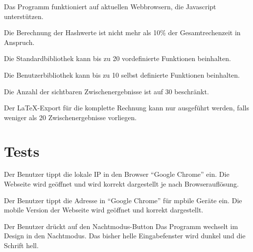 \documentclass[parskip=full,11pt,twoside]{scrartcl}
\begin{document}
Das Programm funktioniert auf aktuellen Webbrowsern, die Javascript unterstützen.

Die Berechnung der Hashwerte ist nicht mehr als 10\% der Gesamtrechenzeit in Anspruch.

Die Standardbibliothek kann bis zu 20 vordefinierte Funktionen beinhalten.

Die Benutzerbibliothek kann bis zu 10 selbst definierte Funktionen beinhalten.

Die Anzahl der sichtbaren Zwischenergebnisse ist auf 30 beschränkt.

Der LaTeX-Export für die komplette Rechnung kann nur ausgeführt werden, falls weniger als 20 Zwischenergebnisse vorliegen.



\newpage
\section{Tests}

{Der Benutzer tippt die lokale IP in den Browser \enquote {Google Chrome} ein.}
{Die Webseite wird geöffnet und wird korrekt dargestellt je nach Browserauflösung.}

{Der Benutzer tippt die Adresse in \enquote{Google Chrome} für mpbile Geräte ein.}
{Die mobile Version der Webseite wird geöffnet und korrekt dargestellt.}

{Der Benutzer drückt auf den Nachtmodus-Button}
{Das Programm wechselt im Design in den Nachtmodus. Das bisher helle Eingabefenster wird dunkel und die Schrift hell.}


\end{document}
